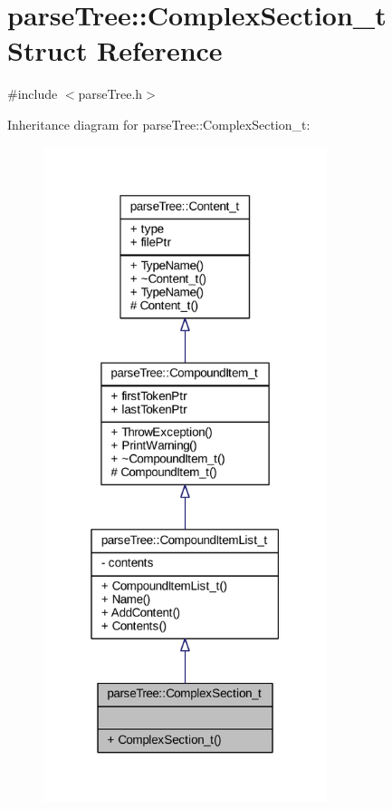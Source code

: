 \hypertarget{structparse_tree_1_1_complex_section__t}{}\section{parse\+Tree\+:\+:Complex\+Section\+\_\+t Struct Reference}
\label{structparse_tree_1_1_complex_section__t}


{\ttfamily \#include $<$parse\+Tree.\+h$>$}



Inheritance diagram for parse\+Tree\+:\+:Complex\+Section\+\_\+t\+:
\nopagebreak
\begin{figure}[H]
\begin{center}
\leavevmode
\includegraphics[width=235pt]{structparse_tree_1_1_complex_section__t__inherit__graph}
\end{center}
\end{figure}


